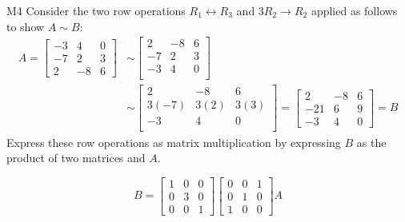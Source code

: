 \begin{problem}{M4}
Consider the two row operations 
\(R_1\leftrightarrow R_3\) and \(3 R_2\to R_2\)
applied as follows to show \(A\sim B\):
\begin{align*}
A
  =
\begin{bmatrix}
-3&4&0\\
-7&2&3\\
2&-8&6
\end{bmatrix}
  &\sim
\begin{bmatrix}
2&-8&6\\
-7&2&3\\
-3&4&0\\
\end{bmatrix}
  \\&\sim
\begin{bmatrix}
2&-8&6\\
3(-7)&3(2)&3(3)\\
-3&4&0\\
\end{bmatrix}
  =
\begin{bmatrix}
2&-8&6\\
-21&6&9\\
-3&4&0
\end{bmatrix}
  =
B
\end{align*}
Express these row operations as matrix multiplication
by expressing \(B\) as the product of two matrices and \(A\).
\end{problem}
\begin{solution}
\[
B
  =
\begin{bmatrix}
  1&0&0\\
  0&3&0\\
  0&0&1
\end{bmatrix}
\begin{bmatrix}
  0&0&1\\
  0&1&0\\
  1&0&0
\end{bmatrix}
A
\]
\end{solution}

